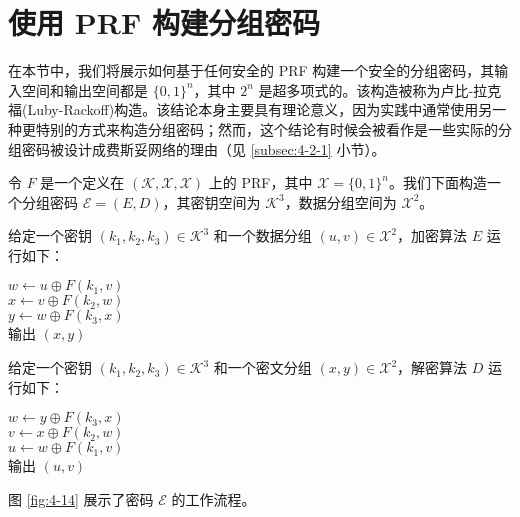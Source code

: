 \section{使用 PRF 构建分组密码}\label{sec:4-5}

在本节中，我们将展示如何基于任何安全的 PRF 构建一个安全的分组密码，其输入空间和输出空间都是 $\{0,1\}^n$，其中 $2^n$ 是超多项式的。该构造被称为卢比-拉克福(Luby-Rackoff)构造。该结论本身主要具有理论意义，因为实践中通常使用另一种更特别的方式来构造分组密码；然而，这个结论有时候会被看作是一些实际的分组密码被设计成费斯妥网络的理由（见 \ref{subsec:4-2-1} 小节）。

令 $F$ 是一个定义在 $(\mathcal{K},\mathcal{X},\mathcal{X})$ 上的 PRF，其中 $\mathcal{X}=\{0,1\}^n$。我们下面构造一个分组密码 $\mathcal{E}=(E,D)$，其密钥空间为 $\mathcal{K}^3$，数据分组空间为 $\mathcal{X}^2$。

给定一个密钥 $(k_1,k_2,k_3)\in\mathcal{K}^3$ 和一个数据分组 $(u,v)\in\mathcal{X}^2$，加密算法 $E$ 运行如下：

\vspace{5pt}

\hspace*{5pt} $w\leftarrow u\oplus F(k_1,v)$\\
\hspace*{26pt} $x\leftarrow v\oplus F(k_2,w)$\\
\hspace*{26pt} $y\leftarrow w\oplus F(k_3,x)$\\
\hspace*{26pt} 输出 $(x,y)$

\vspace{5pt}

\noindent
给定一个密钥 $(k_1,k_2,k_3)\in\mathcal{K}^3$ 和一个密文分组 $(x,y)\in\mathcal{X}^2$，解密算法 $D$ 运行如下：

\vspace{5pt}

\hspace*{5pt} $w\leftarrow y\oplus F(k_3,x)$\\
\hspace*{26pt} $v\leftarrow x\oplus F(k_2,w)$\\
\hspace*{26pt} $u\leftarrow w\oplus F(k_1,v)$\\
\hspace*{26pt} 输出 $(u,v)$

\vspace{5pt}

\noindent
图 \ref{fig:4-14} 展示了密码 $\mathcal{E}$ 的工作流程。

